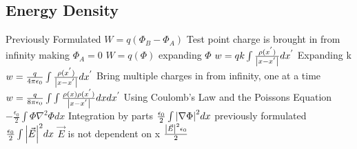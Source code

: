 \documentclass[12pt]{article}
\begin{document}
\subsection{Energy Density}
Previously Formulated
\newline $W = q (\Phi_B - \Phi_A)$
\newline Test point charge is brought in from infinity making $\Phi_A = 0$
\newline $W = q (\Phi)$
\newline expanding $\Phi$
\newline $w = q k \int \frac{\rho(x^{'})}{\abs{x-x^{'}}} dx^{'}$
\newline Expanding k
\newline $w = \frac{q}{4 \pi \epsilon_0} \int \frac{\rho(x^{'})}{\abs{x-x^{'}}} dx^{'}$
\newline Bring multiple charges in from infinity, one at a time
\newline $w = \frac{q}{8 \pi \epsilon_0} \int \int \frac{\rho(x) \rho(x^{'})}{\abs{x-x^{'}}} dx dx^{'}$
\newline Using Coulomb's Law and the Poissons Equation
\newline $-\frac{\epsilon_0}{2} \int \Phi \nabla^2 \Phi dx$
\newline Integration by parts
\newline $\frac{\epsilon_0}{2} \int \abs{\nabla \Phi}^2 dx$
\newline previously formulated
\newline $\frac{\epsilon_0}{2} \int \abs{\vec{E}}^2 dx$
\newline $\vec{E}$ is not dependent on x 
\newline $\frac{\abs{\vec{E}}^2 \epsilon_0}{2}$
\end{document}
